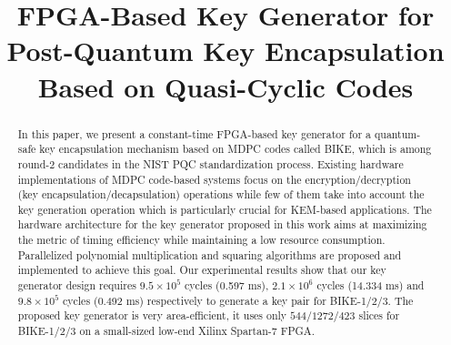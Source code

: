 \documentclass[runningheads]{llncs}
\begin{document}
%
\title{FPGA-Based Key Generator for Post-Quantum Key Encapsulation Based on Quasi-Cyclic Codes}
%
%





\maketitle              %
%


\begin{abstract}
In this paper, we present a constant-time FPGA-based key generator for a
quantum-safe key encapsulation mechanism based on MDPC codes
called BIKE,
which is among round-2 candidates in the NIST PQC standardization process.
Existing hardware implementations of MDPC code-based systems
focus on the encryption/decryption (key encapsulation/decapsulation)
operations while few of them take into account
the key generation operation which is particularly crucial for
KEM-based applications.
The hardware architecture for the key generator
proposed in this work
aims at maximizing the metric of timing efficiency
while maintaining a low resource consumption.
Parallelized polynomial multiplication and squaring
algorithms are proposed
and implemented to achieve this goal.
Our experimental results show that our key generator design
requires $9.5\times 10^5$ cycles (0.597 ms),
$2.1\times 10^6$ cycles (14.334 ms) and $9.8\times 10^5$ cycles (0.492 ms)
respectively
to generate a key pair for BIKE-1/2/3.
The proposed key generator is very area-efficient,
it uses only $544/1272/423$ slices for BIKE-1/2/3 on
a small-sized low-end Xilinx Spartan-7 FPGA.

\end{abstract}
%
%
%
\end{document}
